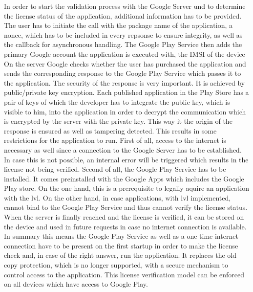In order to start the validation process with the Google Server und to determine the license status of the application, additional information has to be provided.
The user has to initiate the call with  the package name of the application, a nonce, which has to be included in every repsonse to ensure integrity, as well as the callback for asynchronous handling.
The Google Play Service then adds the primary Google account the application is executed with, the IMSI of the device
On the server Google checks whether the user has purchased the application and sends the corresponding response to the Google Play Service which passes it to the application. \cite{developersLicensingOverview}
\newline
The security of the response is very important.
It is achieved by public/private key encryption.
Each published application in the Play Store has a pair of keys of which the developer has to integrate the public key, which is visible to him, into the application in order to decrypt the communication which is encrypted by the server with the private key.
This way it the origin of the response is ensured as well as tampering detected.
\cite{munteanLicense}\cite{developersLicensingOverview}
\newline
This results in some restrictions for the application to run.
First of all, access to the internet is necessary as well since a connection to the Google Server has to be established.
In case this is not possible, an internal error will be triggered which results in the license not being verified.
Second of all, the Google Play Service has to be installed.
It comes preinstalled with the Google Apps which includes the Google Play store.
On the one hand, this is a prerequisite to legally aquire an application with the \gls{lvl}.
On the other hand, in case applications, with \gls{lvl} implemented, cannot bind to the Google Play Service and thus cannot verify the license status.
When the server is finally reached and the license is verified, it can be stored on the device and used in future requests in case no internet connection is available.\cite{developersLicensingAdding }\cite{developersLicensingOverview}
\newline
In summary this means the Google Play Service as well as a one time internet connection have to be present on the first startup in order to make the license check and, in case of the right answer, run the application.
It replaces the old copy protection, which is no longer supported, with a secure mechanism to control access to the application.
This license verification model can be enforced on all devices which have access to Google Play. \cite{developersLicensingAdding} \cite{developersLicensingOverview}
